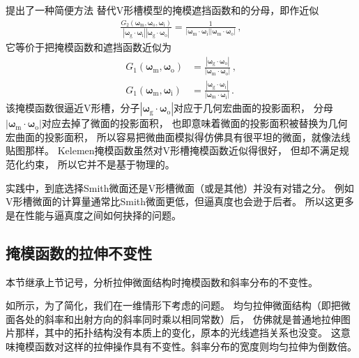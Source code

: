 \citet{10.2312/egs.20011003}提出了一种简便方法
替代V形槽模型的掩模遮挡函数和的分母，即作近似
\begin{align}
    \frac{G_2({\bm\omega}_{\mathrm{m}},{\bm\omega}_{\mathrm{o}},{\bm\omega}_{\mathrm{i}})}
    {|{\bm\omega}_{\mathrm{g}}\cdot{\bm\omega}_{\mathrm{i}}|
    |{\bm\omega}_{\mathrm{g}}\cdot{\bm\omega}_{\mathrm{o}}|}
    =\frac{1}{|{\bm\omega}_{\mathrm{m}}\cdot{\bm\omega}_{\mathrm{i}}|
    |{\bm\omega}_{\mathrm{m}}\cdot{\bm\omega}_{\mathrm{o}}|}\, ,
\end{align}
它等价于把掩模函数和遮挡函数近似为
\begin{align}
    G_1({\bm\omega}_{\mathrm{m}},{\bm\omega}_{\mathrm{o}}) & =
    \frac{|{\bm\omega}_{\mathrm{g}}\cdot{\bm\omega}_{\mathrm{o}}|}
    {|{\bm\omega}_{\mathrm{m}}\cdot{\bm\omega}_{\mathrm{o}}|}\, , \\
    G_1({\bm\omega}_{\mathrm{m}},{\bm\omega}_{\mathrm{i}}) & =
    \frac{|{\bm\omega}_{\mathrm{g}}\cdot{\bm\omega}_{\mathrm{i}}|}
    {|{\bm\omega}_{\mathrm{m}}\cdot{\bm\omega}_{\mathrm{i}}|}\, .
\end{align}
该掩模函数很逼近V形槽，分子$|{\bm\omega}_{\mathrm{g}}\cdot{\bm\omega}_{\mathrm{o}}|$对应于几何宏曲面的投影面积，
分母$|{\bm\omega}_{\mathrm{m}}\cdot{\bm\omega}_{\mathrm{o}}|$对应去掉了微面的投影面积，
也即意味着微面的投影面积被替换为几何宏曲面的投影面积，
所以容易把微曲面模拟得仿佛具有很平坦的微面，就像法线贴图那样。
Kelemen掩模函数虽然对V形槽掩模函数近似得很好，
但却不满足规范化约束，
所以它并不是基于物理的。

实践中，到底选择Smith微面还是V形槽微面（或是其他）并没有对错之分。
例如V形槽微面的计算量通常比Smith微面更低，但逼真度也会逊于后者。
所以这更多是在性能与逼真度之间如何抉择的问题。

\subsection{掩模函数的拉伸不变性}\label{sub:掩模函数的拉伸不变性}
本节继承上节记号，分析拉伸微面结构时掩模函数和斜率分布的不变性。

如所示，为了简化，我们在一维情形下考虑的问题。
均匀拉伸微面结构（即把微面各处的斜率和出射方向的斜率同时乘以相同常数）后，
仿佛就是普通地拉伸图片那样，其中的拓扑结构没有本质上的变化，原本的光线遮挡关系也没变。
这意味掩模函数对这样的拉伸操作具有不变性。斜率分布的宽度则均匀拉伸为倒数倍。


